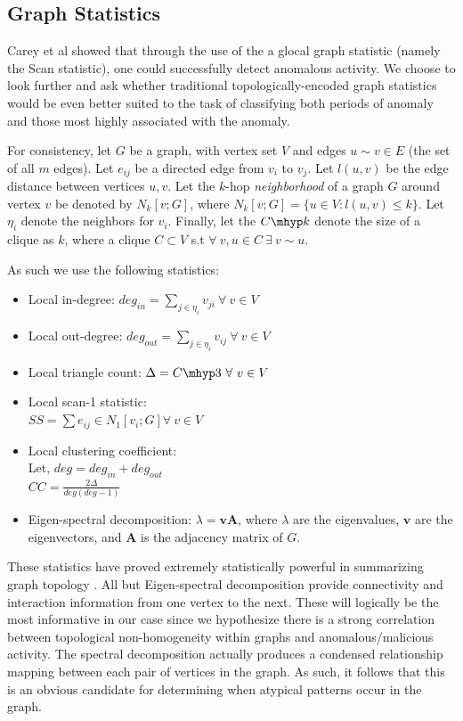 \documentclass[11pt,letterpaper]{article}
\begin{document}
\subsection{Graph Statistics} \label{graph_stats}
Carey et al \cite{priebe2005scan} showed that through the use of the a glocal graph 
statistic (namely the Scan statistic), one could successfully detect anomalous activity.
We choose to look further and ask whether traditional topologically-encoded graph statistics would
be even better suited to the task of classifying both periods of anomaly and those
most highly associated with the anomaly.

For consistency, let $G$ be a graph, with vertex set $V$ and edges $u \sim v \in E$ (the set of
all $m$ edges). Let $e_{ij}$ be a directed edge from $v_i$ to $v_j$. Let $l(u,v)$ be the edge
distance between vertices $u, v$. Let the $k$-hop \emph{neighborhood} of a graph $G$ around
vertex $v$ be denoted by $N_k[v;G]$, where $N_k[v;G] = \{u \in V:l(u,v) \le k\}$. Let $\eta_i$ 
denote the neighbors for $v_i$. Finally, let the $C\mhyp k$ denote the size of a clique as $k$, where a clique $C \subset V$ s.t $\forall\ v,u \in C\ \exists\ v \sim u$.

 
As such we use the following statistics:
\begin{itemize}
\item Local in-degree: $deg_{in} = \sum_{j \in \eta_i} v_{ji}\  \forall\ v \in V$
\item Local out-degree: $deg_{out} = \sum_{j \in \eta_i} v_{ij}\  \forall\ v \in V$ 
\item Local triangle count: $\Delta = C\mhyp3 \  \forall\ v \in V$
\item Local scan-1 statistic: \\ $SS = \sum e_{ij} \in N_1[v_i;G] \forall\ v \in V$
\item Local clustering coefficient: \\ Let, $deg = deg_{in} + deg_{out}$ 
\\ $CC = \frac{2\Delta}{deg (deg-1)}$
\item Eigen-spectral decomposition: $\lambda = \mathbf{vA}$, where $\lambda$ are the
eigenvalues, $\mathbf{v}$ are the eigenvectors, and $\mathbf{A}$ is the adjacency matrix of $G$.

\end{itemize}
These statistics have proved extremely statistically powerful in summarizing graph
topology \cite{pao2011statistical}. All but Eigen-spectral decomposition provide
connectivity and interaction information from one vertex to the next. These will
logically be the most informative in our case since we hypothesize there is a strong
correlation between topological non-homogeneity within graphs and anomalous/malicious
activity. The spectral decomposition actually produces a condensed relationship mapping
between each pair of vertices in the graph. As such, it follows that this is an obvious
candidate for determining when atypical patterns occur in the graph.
\end{document}
